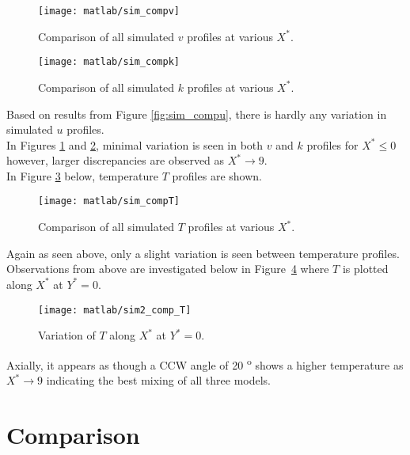 \begin{figure}[H]
	\centering
	\texttt{[image: matlab/sim\_compv]}
	\caption{Comparison of all simulated $v$ profiles at various $X^*$.}
	\label{fig:sim_compv}
\end{figure}

\begin{figure}[H]
	\centering
	\texttt{[image: matlab/sim\_compk]}
	\caption{Comparison of all simulated $k$ profiles at various $X^*$.}
	\label{fig:sim_compk}
\end{figure}

Based on results from Figure \ref{fig:sim_compu}, there is hardly any variation in simulated $u$ profiles.\\

In Figures \ref{fig:sim_compv} and \ref{fig:sim_compk}, minimal variation is seen in both $v$ and $k$ profiles for $X^* \leq 0$ however, larger discrepancies are observed as $X^* \rightarrow 9$.\\

In Figure \ref{fig:sim_compT} below, temperature $T$ profiles are shown.
\begin{figure}[H]
	\centering
	\texttt{[image: matlab/sim\_compT]}
	\caption{Comparison of all simulated $T$ profiles at various $X^*$.}
	\label{fig:sim_compT}
\end{figure}

Again as seen above, only a slight variation is seen between temperature profiles.\\

Observations from above are investigated below in Figure~\ref{fig:sim2_comp_T} where $T$ is plotted along $X^*$ at $Y^*=0$.
\begin{figure}[H]
	\centering
	\texttt{[image: matlab/sim2\_comp\_T]}
	\caption{Variation of $T$ along $X^*$ at $Y^*=0$.}
	\label{fig:sim2_comp_T}
\end{figure}

Axially, it appears as though a CCW angle of 20 \textsuperscript{o} shows a higher temperature as $X^* \rightarrow 9$ indicating the best mixing of all three models.

\section{Comparison}
\label{sec:comp}

